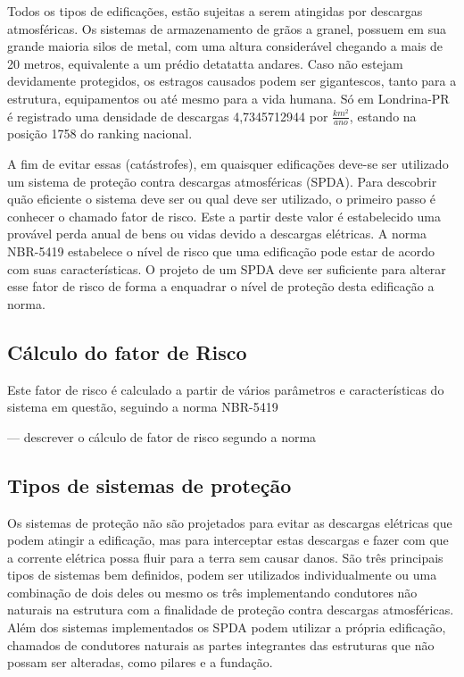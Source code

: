 Todos os tipos de edificações, estão sujeitas a serem atingidas por descargas atmosféricas. 
Os sistemas de armazenamento de grãos a granel, possuem em sua grande maioria silos de metal, com uma altura considerável chegando a mais de 20 metros, equivalente a um prédio detatatta andares. Caso não estejam devidamente protegidos, os estragos causados podem ser gigantescos, tanto para a estrutura, equipamentos ou até mesmo para a vida humana. Só em Londrina-PR é registrado uma densidade de descargas 4,7345712944 por $\frac{km^2}{ano}$, estando na posição 1758 do ranking nacional. %

A fim de evitar essas (catástrofes), em quaisquer edificações deve-se ser utilizado um sistema de proteção contra descargas atmosféricas (SPDA). Para descobrir quão eficiente o sistema deve ser ou qual deve ser utilizado, o primeiro passo é conhecer o chamado fator de risco. Este a partir deste valor é estabelecido uma provável perda anual de bens ou vidas devido a descargas elétricas. A norma NBR-5419 estabelece o nível de risco que uma edificação pode estar de acordo com suas características. O projeto de um SPDA deve ser suficiente para alterar esse fator de risco de forma a enquadrar o nível de proteção desta edificação a norma. 



\subsection{Cálculo do fator de Risco}
Este fator de risco é calculado a partir de vários parâmetros e características do sistema em questão, seguindo a norma NBR-5419

--- descrever o cálculo de fator de risco segundo a norma

\subsection*{Tipos de sistemas de proteção}

Os sistemas de proteção não são projetados para evitar as descargas elétricas que podem atingir a edificação, mas para interceptar estas descargas e fazer com que a corrente elétrica possa fluir para a terra sem causar danos.
São três principais tipos de sistemas bem definidos, podem ser utilizados individualmente ou uma combinação de dois deles ou mesmo os três implementando condutores não naturais na estrutura com a finalidade de proteção contra descargas atmosféricas. Além dos sistemas implementados os SPDA podem utilizar a própria edificação, chamados de condutores naturais as partes integrantes das estruturas que não possam ser alteradas, como pilares e a fundação. 


